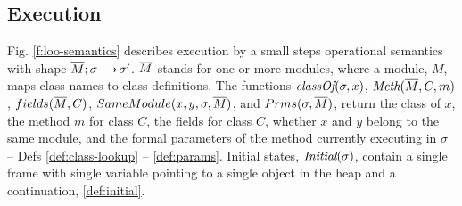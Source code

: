   

  
\subsection{\LangOO Execution}
\label{sect:execution}

{Fig. \ref{f:loo-semantics} describes \LangOO execution}  by a small steps operational semantics with shape  $\overline{M};\sigma\! \dashrightarrow\! {\sigma'}$.
  $\overline{M}$ stands for one or more modules, where a
  module,  $M$, maps class names to class definitions. 
  {%
  The functions $\textit{classOf}(\sigma, x)$, $\textit{Meth}(\overline{M}, C, m)$,
  { $fields(\overline{M},C)$,}
    ${SameModule(x,y,\sigma,\overline{M})}$, and $Prms(\sigma,\overline{M})$,
return the class of $x$, the method $m$ for class $C$, {the fields for class $C$,} whether $x$ and $y$ belong to the same module, and 
 the formal parameters of the method currently executing in $\sigma$ -- \cf Defs
\ref{def:class-lookup} -- \ref{def:params}. %
Initial states, $\textit{Initial}(\sigma)$, contain a single frame 
with single variable  pointing to a single object 
in the heap %
and a continuation, \cf \ref{def:initial}.
}

